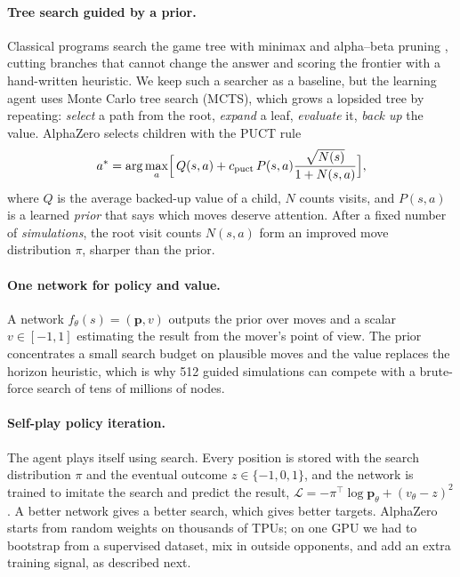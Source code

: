 \documentclass[conference]{IEEEtran}
\begin{document}
\paragraph{Tree search guided by a prior.}
Classical programs search the game tree with minimax and alpha--beta
pruning \cite{knuth1975alphabeta}, cutting branches that cannot change the
answer and scoring the frontier with a hand-written heuristic. We keep
such a searcher as a baseline, but the learning agent uses Monte Carlo tree
search (MCTS), which grows a lopsided tree by repeating: \emph{select} a
path from the root, \emph{expand} a leaf, \emph{evaluate} it, \emph{back
up} the value. AlphaZero selects children with the PUCT rule
\cite{rosin2011puct}
\begin{equation}
  a^\ast=\arg\max_{a}\Bigl[\,Q(s,a)+c_{\mathrm{puct}}\,P(s,a)\frac{\sqrt{N(s)}}{1+N(s,a)}\Bigr],
  \label{eq:puct}
\end{equation}
where $Q$ is the average backed-up value of a child, $N$ counts visits,
and $P(s,a)$ is a learned \emph{prior} that says which moves deserve
attention. After a fixed number of \emph{simulations}, the root visit
counts $N(s,a)$ form an improved move distribution $\pi$, sharper than the
prior.

\paragraph{One network for policy and value.}
A network $f_\theta(s)=(\mathbf p,v)$ outputs the prior over moves and a
scalar $v\in[-1,1]$ estimating the result from the mover's point of view.
The prior concentrates a small search budget on plausible moves and the
value replaces the horizon heuristic, which is why 512 guided simulations
can compete with a brute-force search of tens of millions of nodes.

\paragraph{Self-play policy iteration.}
The agent plays itself using search. Every position is stored with the
search distribution $\pi$ and the eventual outcome $z\in\{-1,0,1\}$, and
the network is trained to imitate the search and predict the result,
$\mathcal L=-\pi^\top\log\mathbf p_\theta+(v_\theta-z)^2$. A better network
gives a better search, which gives better targets. AlphaZero starts from
random weights on thousands of TPUs; on one GPU we had to bootstrap from a
supervised dataset, mix in outside opponents, and add an extra training
signal, as described next.
\end{document}
